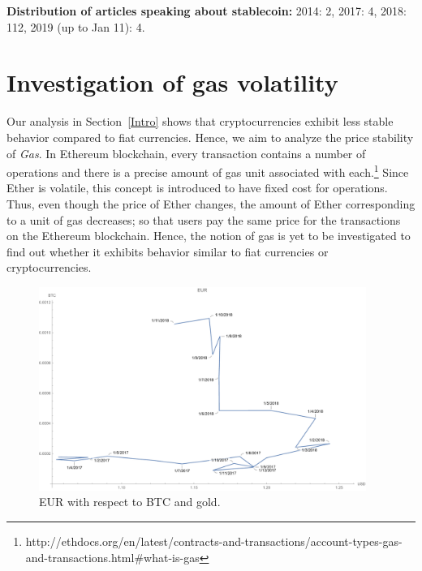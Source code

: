 \textbf{Distribution of articles speaking about stablecoin:} 2014: 2, 2017: 4, 2018: 112, 2019 (up to Jan 11): 4.



\section{Investigation of gas volatility}
 \par
Our analysis in Section~\ref{Intro} shows that cryptocurrencies exhibit less stable behavior compared to fiat currencies. Hence, we aim to analyze the price stability of \emph{Gas}. In Ethereum blockchain, every transaction contains a number of operations and there is a precise amount of gas unit associated with each.\footnote{http://ethdocs.org/en/latest/contracts-and-transactions/account-types-gas-and-transactions.html\#what-is-gas} Since Ether is volatile, this concept is introduced to have fixed cost for operations. Thus, even though the price of Ether changes, the amount of Ether corresponding to a unit of gas decreases; so that users pay the same price for the transactions on the Ethereum blockchain. Hence, the notion of gas is yet to be investigated to find out whether it exhibits behavior similar to fiat currencies or cryptocurrencies.


\begin{figure}[!htb]
	\centering
	\includegraphics[width=0.95\textwidth]{figures/eur.pdf}
	\caption{\label{fig:eur} EUR with respect to BTC and gold.}
\end{figure}

